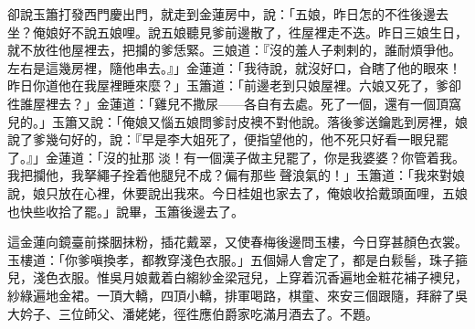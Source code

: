 卻說玉簫打發西門慶出門，就走到金蓮房中，說：「五娘，昨日怎的不徃後邊去坐？俺娘好不說五娘哩。說五娘聽見爹前邊散了，徃屋裡走不迭。昨日三娘生日，就不放徃他屋裡去，把攔的爹恁緊。{}三娘道：『沒的羞人子剌剌的，誰耐煩爭他。左右是這幾房裡，隨他串去。』」{}金蓮道：「我待說，就沒好口，㒲瞎了他的眼來！昨日你道他在我屋裡睡來麼？」玉簫道：「前邊老到只娘屋裡。六娘又死了，爹卻徃誰屋裡去？」金蓮道：「雞兒不撒尿——各自有去處。死了一個，還有一個頂窩兒的。」玉簫又說：「俺娘又惱五娘問爹討皮襖不對他說。落後爹送鑰匙到房裡，娘說了爹幾句好的，說：『早是李大姐死了，便指望他的，他不死只好看一眼兒罷了。』」{}金蓮道：「沒的扯那𣭈淡！有一個漢子做主兒罷了，你是我婆婆？你管着我。我把攔他，我拏繩子拴着他腿兒不成？偏有那些𣭈聲浪氣的！」玉簫道：「我來對娘說，娘只放在心裡，休要說出我來。今日桂姐也家去了，俺娘收拾戴頭面哩，五娘也快些收拾了罷。」說畢，玉簫後邊去了。

這金蓮向鏡臺前搽胭抹粉，插花戴翠，又使春梅後邊問玉樓，今日穿甚顏色衣裳。玉樓道：「你爹嗔換孝，都教穿淺色衣服。」五個婦人會定了，都是白鬏髻，珠子箍兒，淺色衣服。惟吳月娘戴着白縐紗金梁冠兒，上穿着沉香遍地金粧花補子襖兒，紗綠遍地金裙。一頂大轎，四頂小轎，排軍喝路，棋童、來安三個跟隨，拜辭了吳大妗子、三位師父、潘姥姥，徑徃應伯爵家吃滿月酒去了。不題。

